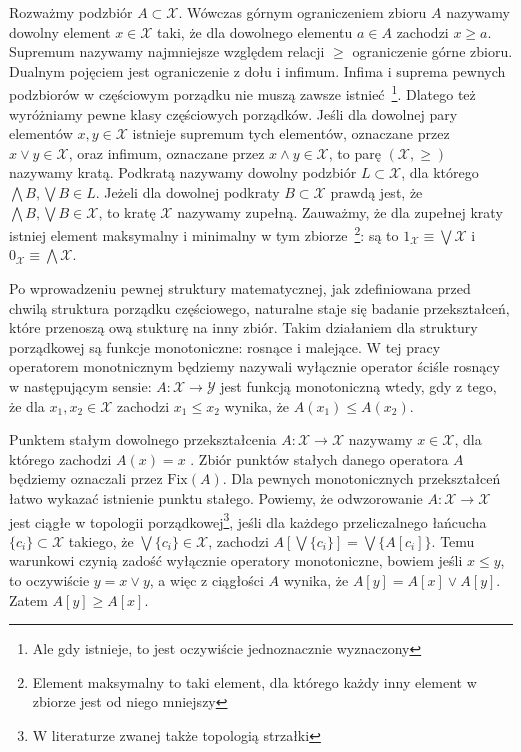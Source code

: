 Rozważmy podzbiór $ A \subset \mathcal{X} $. Wówczas górnym ograniczeniem zbioru $ A $ nazywamy dowolny element $ x \in \mathcal{X} $ taki, że dla dowolnego elementu $ a \in A $ zachodzi $ x \geq a $. Supremum nazywamy najmniejsze względem relacji $ \geq $ ograniczenie górne zbioru. Dualnym pojęciem jest ograniczenie z dołu i infimum. Infima i suprema pewnych podzbiorów w częściowym porządku nie muszą zawsze istnieć~\footnote{Ale gdy istnieje, to jest oczywiście jednoznacznie wyznaczony}. Dlatego też wyróżniamy pewne klasy częściowych porządków. Jeśli dla dowolnej pary elementów $ x, y \in \mathcal{X} $ istnieje supremum tych elementów, oznaczane przez $ x \vee y \in \mathcal{X}$, oraz infimum, oznaczane przez $ x \wedge y \in \mathcal{X}$, to parę $ (\mathcal{X}, \geq) $ nazywamy kratą. Podkratą nazywamy dowolny podzbiór $ L \subset \mathcal{X} $, dla którego $\bigwedge B , \bigvee B \in L$. Jeżeli dla dowolnej podkraty $ B \subset \mathcal{X} $ prawdą jest, że  $\bigwedge B , \bigvee B \in \mathcal{X} $, to kratę $ \mathcal{X} $ nazywamy zupełną. Zauważmy, że dla zupełnej kraty istniej element maksymalny i minimalny w tym zbiorze~\footnote{Element maksymalny to taki element, dla którego każdy inny element w zbiorze jest od niego mniejszy}: są to $ 1_{\mathcal{X}} \equiv \bigvee \mathcal{X} $ i $ 0_{\mathcal{X}} \equiv \bigwedge \mathcal{X} $.   

Po wprowadzeniu pewnej struktury matematycznej, jak zdefiniowana przed chwilą struktura porządku częściowego, naturalne staje się badanie przekształceń, które przenoszą ową stukturę na inny zbiór. Takim działaniem dla struktury porządkowej są funkcje monotoniczne: rosnące i malejące.  W tej pracy operatorem monotnicznym będziemy nazywali wyłącznie operator ściśle rosnący w następującym sensie: $ A : \mathcal{X} \rightarrow \mathcal{Y} $ jest funkcją monotoniczną wtedy, gdy z tego, że dla $ x_1,x_2 \in \mathcal{X}  $ zachodzi $ x_1 \leq x_2 $ wynika, że $ A(x_1) \leq A(x_2)$. 

Punktem stałym dowolnego przekształcenia $ A : \mathcal{X} \rightarrow \mathcal{X} $ nazywamy $ x \in \mathcal{X} $, dla którego zachodzi $ A(x)=x $ . Zbiór punktów stałych danego operatora $ A $ będziemy oznaczali przez $ \mathrm{Fix}(A) $. Dla pewnych monotonicznych przekształceń łatwo wykazać istnienie punktu stałego. Powiemy, że odwzorowanie $A: \mathcal{X} \rightarrow \mathcal{X}$ jest ciągłe w topologii porządkowej\footnote{W literaturze zwanej także topologią strzałki}, jeśli dla każdego przeliczalnego łańcucha $\{c_i\} \subset \mathcal{X}$ takiego, że $\bigvee \{c_i\} \in \mathcal{X}$, zachodzi $A[\bigvee \{c_i\}] = \bigvee \{ A[c_i]\}$. Temu warunkowi czynią zadość wyłącznie operatory monotoniczne, bowiem jeśli $x \leq y$, to oczywiście $y = x \vee y$, a więc z ciągłości $A$ wynika, że $A[y] = A[x] \vee A[y]$. Zatem $A[y]\geq A[x]$.  

